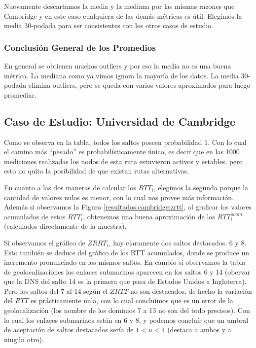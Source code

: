 Nuevamente descartamos la media y la mediana por las mismas razones que Cambridge y en este caso cualquiera de las demás métricas es útil. Elegimos
la media 30-podada para ser consistentes con los otros casos de estudio.

\subsubsection{Conclusión General de los Promedios}

En general se obtienen muchos outliers y por eso la media no es una buena métrica. La mediana como ya vimos ignora la mayoría de los datos.
La media 30-podada elimina outliers, pero se queda con varios valores aproximados para luego promediar.


\newpage


\subsection{Caso de Estudio: Universidad de Cambridge}

Como se observa en la tabla, todos los saltos poseen probabilidad 1. Con lo cual el camino más ``pesado'' es probabilísticamente único, es decir que en las 1000 mediciones realizadas
los nodos de esta ruta estuvieron activos y estables, pero esto no quita la posibilidad de que existan rutas alternativas.

En cuanto a las dos maneras de calcular los $RTT_i$, elegimos la segunda porque la cantidad de valores nulos es menor, con lo cual nos provee más información.
Además si observamos la Figura \ref{resultados:cambridge:zrtt}, al graficar los valores acumulados de estos $RTT_i$, obtenemos una buena aproximación de los $RTT^{acum}_{i}$
(calculados directamente de la muestra).

Si observamos el gráfico de $ZRRT_i$, hay claramente dos saltos destacados: 6 y 8. Esto también se deduce del gráfico de los RTT
acumulados, donde se produce un incremento pronunciado en los mismos saltos. En cambio si observamos la tabla de geolocalizaciones los enlaces
submarinos aparecen en los saltos 6 y 14 (obervar que la DNS del salto 14 es la primera que pasa de Estados Unidos a Inglaterra). Pero los saltos
del 7 al 14 según el $ZRTT$ no son destacados, de hecho la variación del $RTT$ es prácticamente nula, con lo cual concluímos que es un error
de la geolocalización (los nombre de los dominios 7 a 13 no son del todo precisos). Con lo cual los enlaces submarinos están en 6 y 8, y podemos
concluír que un umbral de aceptación de saltos destacados sería de $1<u<4$ (destaca a ambos y a ningún otro).

